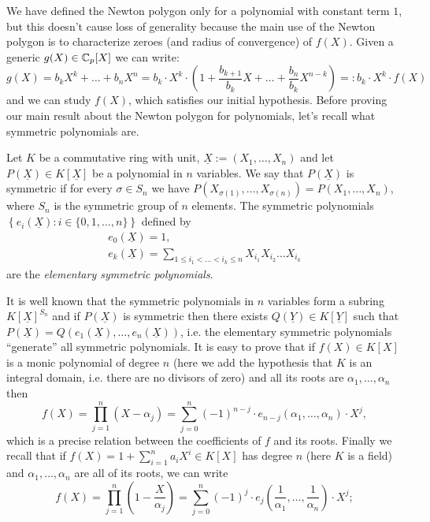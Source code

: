 		We have defined the Newton polygon only for a polynomial with constant term $1$, but this doesn't cause loss of generality because the main use of the Newton polygon is to characterize zeroes (and radius of convergence) of $f(X)$. Given a generic $g(X) \in \mathbb{C}_p[X]$ we can write:
		\[
			g(X) = b_kX^k + \dots + b_nX^n = b_k\cdot X^k \cdot \left(1 + \frac{b_{k+1}}{b_k}X + \dots + \frac{b_n}{b_k}X^{n-k}\right) =: b_k \cdot X^k \cdot f(X)
		\]
		and we can study $f(X)$, which satisfies our initial hypothesis.	Before proving our main result about the Newton polygon for polynomials, let's recall what symmetric polynomials are.
		\begin{defn}
			Let $K$ be a commutative ring with unit, $\underline{X} := (X_1, \dots, X_n)$ and let $P(\underline{X}) \in K[\underline{X}]$ be a polynomial in $n$ variables. We say that $P(\underline{X})$ is symmetric if for every $\sigma \in S_n$ we have $P(X_{\sigma(1)}, \dots, X_{\sigma(n)}) = P(X_1, \dots, X_n)$, where $S_n$ is the symmetric group of $n$ elements. \newline
			The symmetric polynomials $\left\{e_i(\underline{X}) : i \in \{0, 1, \dots, n\}\right\}$ defined by
			\begin{gather*}
				e_0(\underline{X}) = 1,\\
				e_k(\underline{X}) = \sum_{1 \leq i_1 < \dots < i_k \leq n} X_{i_1}X_{i_2}\dots X_{i_k}
			\end{gather*}
			are the \emph{elementary symmetric polynomials}.
		\end{defn}
		It is well known that the symmetric polynomials in $n$ variables form a subring $K[\underline{X}]^{S_n}$ and if $P(\underline{X})$ is symmetric then there exists $Q(\underline{Y}) \in K[\underline{Y}]$ such that $P(\underline{X}) = Q(e_1(\underline{X}), \dots, e_n(\underline{X}))$, i.e. the elementary symmetric polynomials ``generate'' all symmetric polynomials.
		It is easy to prove that if $f(X) \in K[X]$ is a monic polynomial of degree $n$ (here we add the hypothesis that $K$ is an integral domain, i.e. there are no divisors of zero) and all its roots are $\alpha_1, \dots, \alpha_n$ then
		\[
			f(X) = \prod_{j=1}^n \left(X - \alpha_j\right) = \sum_{j=0}^n (-1)^{n-j} \cdot e_{n-j}(\alpha_1, \dots, \alpha_n) \cdot X^j,
		\]
		which is a precise relation between the coefficients of $f$ and its roots. Finally we recall that if $f(X) = 1 + \sum_{i=1}^n a_iX^i \in K[X]$ has degree $n$ (here $K$ is a field) and $\alpha_1, \dots, \alpha_n$ are all of its roots, we can write
		\[
		f(X) = \prod_{j=1}^n \left(1 - \frac{X}{\alpha_j}\right) = \sum_{j=0}^n (-1)^j \cdot e_j\left(\frac{1}{\alpha_1}, \dots, \frac{1}{\alpha_n}\right) \cdot X^j;
		\]
